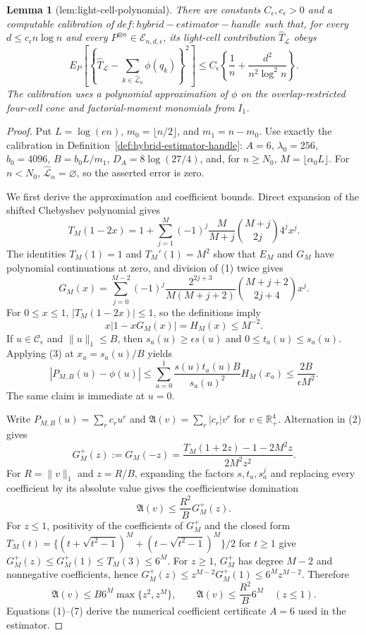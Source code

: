 \documentclass{article}
\newtheorem{lemma}{Lemma}
\begin{document}
\begin{lemma}[lem:light-cell-polynomial]\label{lem:light-cell-polynomial}
There are constants \(C_\epsilon,c_\epsilon>0\) and a computable calibration of \(def:hybrid-estimator-handle\) such that, for every \(d\le c_\epsilon n\log n\) and every \(P^{\otimes n}\in\mathcal E_{n,d,\epsilon}\), its light-cell contribution \(\widehat T_{\mathcal L}\) obeys \[ E_P\!\left[\left\{\widehat T_{\mathcal L}-\sum_{k\in\widehat{\mathcal L}_n}\phi(q_k)\right\}^2\right]\le C_\epsilon\left\{\frac{1}{n}+\frac{d^2}{n^2\log^2 n}\right\}. \] The calibration uses a polynomial approximation of \(\phi\) on the overlap-restricted four-cell cone and factorial-moment monomials from \(I_1\).
\end{lemma}
\begin{proof}
Put \(L=\log(en)\), \(m_0=\lfloor n/2\rfloor\), and \(m_1=n-m_0\). Use exactly the calibration in Definition~\ref{def:hybrid-estimator-handle}: \(A=6\), \(\lambda_0=256\), \(b_0=4096\), \(B=b_0L/m_1\), \(D_A=8\log(27/4)\), and, for \(n\ge N_0\), \(M=\lfloor\alpha_0L\rfloor\). For \(n<N_0\), \(\widehat{\mathcal L}_n=\varnothing\), so the asserted error is zero.

We first derive the approximation and coefficient bounds. Direct expansion of the shifted Chebyshev polynomial gives
\[
T_M(1-2x)=1+\sum_{j=1}^M(-1)^j\frac{M}{M+j}\binom{M+j}{2j}4^jx^j.
\tag{1}
\]
The identities \(T_M(1)=1\) and \(T_M'(1)=M^2\) show that \(E_M\) and \(G_M\) have polynomial continuations at zero, and division of (1) twice gives
\[
G_M(x)=\sum_{j=0}^{M-2}(-1)^j\frac{2^{2j+3}}{M(M+j+2)}\binom{M+j+2}{2j+4}x^j.
\tag{2}
\]
For \(0\le x\le1\), \(|T_M(1-2x)|\le1\), so the definitions imply
\[
x|1-xG_M(x)|=H_M(x)\le M^{-2}.
\tag{3}
\]
If \(u\in\mathcal C_\epsilon\) and \(\|u\|_1\le B\), then \(s_a(u)\ge\epsilon s(u)\) and \(0\le t_a(u)\le s_a(u)\). Applying (3) at \(x_a=s_a(u)/B\) yields
\[
|P_{M,B}(u)-\phi(u)|\le\sum_{a=0}^1\frac{s(u)t_a(u)B}{s_a(u)^2}H_M(x_a)\le\frac{2B}{\epsilon M^2}.
\tag{4}
\]
The same claim is immediate at \(u=0\).

Write \(P_{M,B}(u)=\sum_rc_ru^r\) and \(\mathfrak A(v)=\sum_r|c_r|v^r\) for \(v\in\mathbb R_+^4\). Alternation in (2) gives
\[
G_M^+(z):=G_M(-z)=\frac{T_M(1+2z)-1-2M^2z}{2M^2z^2}.
\tag{5}
\]
For \(R=\|v\|_1\) and \(z=R/B\), expanding the factors \(s,t_a,s_a^j\) and replacing every coefficient by its absolute value gives the coefficientwise domination
\[
\mathfrak A(v)\le\frac{R^2}{B}G_M^+(z).
\tag{6}
\]
For \(z\le1\), positivity of the coefficients of \(G_M^+\) and the closed form \(T_M(t)=\{(t+\sqrt{t^2-1})^M+(t-\sqrt{t^2-1})^M\}/2\) for \(t\ge1\) give \(G_M^+(z)\le G_M^+(1)\le T_M(3)\le6^M\). For \(z\ge1\), \(G_M^+\) has degree \(M-2\) and nonnegative coefficients, hence \(G_M^+(z)\le z^{M-2}G_M^+(1)\le6^Mz^{M-2}\). Therefore
\[
\mathfrak A(v)\le B6^M\max\{z^2,z^M\},\qquad \mathfrak A(v)\le\frac{R^2}{B}6^M\quad(z\le1).
\tag{7}
\]
Equations (1)--(7) derive the numerical coefficient certificate \(A=6\) used in the estimator.


\end{proof}
\end{document}
